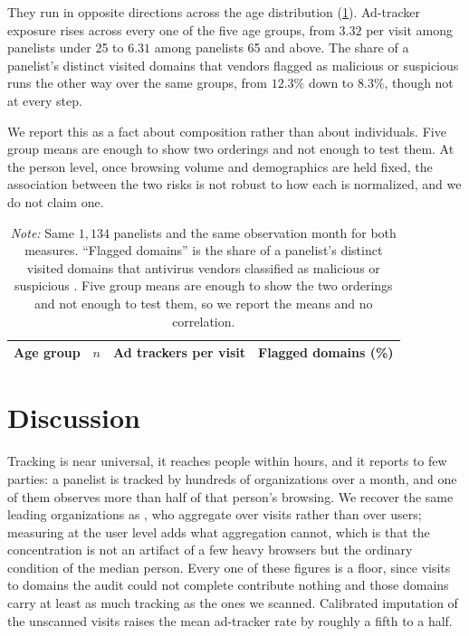 \documentclass[12pt, letterpaper]{article}
\begin{document}
They run in opposite directions across the age distribution (\cref{tab:risk_divergence_by_age}). Ad-tracker exposure rises across every one of the five age groups, from $3.32$ per visit among panelists under 25 to $6.31$ among panelists 65 and above. The share of a panelist's distinct visited domains that vendors flagged as malicious or suspicious runs the other way over the same groups, from $12.3\%$ down to $8.3\%$, though not at every step.
 
We report this as a fact about composition rather than about individuals. Five group means are enough to show two orderings and not enough to test them. At the person level, once browsing volume and demographics are held fixed, the association between the two risks is not robust to how each is normalized, and we do not claim one.
 
\begin{table}[ht]
\centering
\caption{Two online risks, opposite age gradients}
\label{tab:risk_divergence_by_age}
\begin{tabular}{lrrr}
\toprule
Age group & $n$ & Ad trackers per visit & Flagged domains (\%) \\
\midrule

\bottomrule
\end{tabular}
\caption*{\textit{Note:} Same $1{,}134$ panelists and the same observation month for both measures. ``Flagged domains'' is the share of a panelist's distinct visited domains that antivirus vendors classified as malicious or suspicious \citep{bad_domains}. Five group means are enough to show the two orderings and not enough to test them, so we report the means and no correlation.}
\end{table}

\section{Discussion}
\label{sec:discussion}


Tracking is near universal, it reaches people within hours, and it reports to few parties: a panelist is tracked by hundreds of organizations over a month, and one of them observes more than half of that person's browsing. We recover the same leading organizations as \citet{Dambra2022}, who aggregate over visits rather than over users; measuring at the user level adds what aggregation cannot, which is that the concentration is not an artifact of a few heavy browsers but the ordinary condition of the median person. Every one of these figures is a floor, since visits to domains the audit could not complete contribute nothing and those domains carry at least as much tracking as the ones we scanned. Calibrated imputation of the unscanned visits raises the mean ad-tracker rate by roughly a fifth to a half.
 
\end{document}
